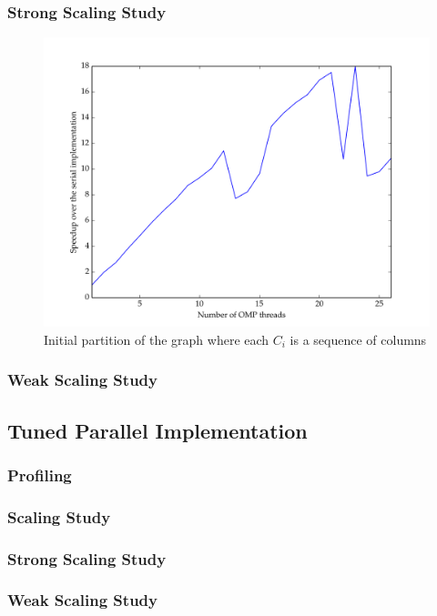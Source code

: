 \documentclass[11pt]{article}
\begin{document}
\subsubsection{Strong Scaling Study}
\begin{figure}
\centering
\includegraphics[scale=0.2]{./scaling_studies/strong_scaling.png}
\caption{Initial partition of the graph where each $C_i$ is a sequence of columns}
\label{fig:init_part}
\end{figure}
\subsubsection{Weak Scaling Study}

\subsection{Tuned Parallel Implementation}
\subsubsection{Profiling} \label{sec:prof}
\subsubsection{Scaling Study} \label{sec:speedup}
\subsubsection{Strong Scaling Study}
\subsubsection{Weak Scaling Study}
\end{document}
